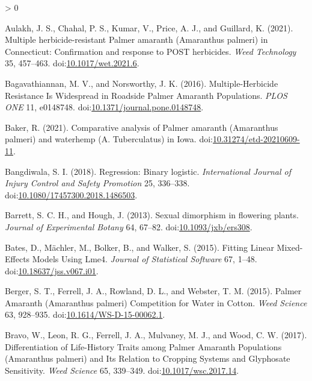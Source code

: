 \documentclass[utf8]{frontiersSCNS}
\newlength{\cslhangindent}
\newenvironment{CSLReferences}[2] %
 {%
  \setlength{\parindent}{0pt}
  \ifodd #1 \everypar{\setlength{\hangindent}{\cslhangindent}}\ignorespaces\fi
  \ifnum #2 > 0
  \setlength{\parskip}{#2\baselineskip}
  \fi
 }%
 {}
\begin{document}
\hypertarget{refs}{}
\begin{CSLReferences}{1}{0}
\leavevmode\hypertarget{ref-aulakh2021}{}%
Aulakh, J. S., Chahal, P. S., Kumar, V., Price, A. J., and Guillard, K.
(2021). Multiple herbicide-resistant {Palmer} amaranth ({Amaranthus}
palmeri) in {Connecticut}: Confirmation and response to {POST}
herbicides. \emph{Weed Technology} 35, 457--463.
doi:\href{https://doi.org/10.1017/wet.2021.6}{10.1017/wet.2021.6}.

\leavevmode\hypertarget{ref-bagavathiannan2016}{}%
Bagavathiannan, M. V., and Norsworthy, J. K. (2016). Multiple-{Herbicide
Resistance Is Widespread} in {Roadside Palmer Amaranth Populations}.
\emph{PLOS ONE} 11, e0148748.
doi:\href{https://doi.org/10.1371/journal.pone.0148748}{10.1371/journal.pone.0148748}.

\leavevmode\hypertarget{ref-baker2021}{}%
Baker, R. (2021). Comparative analysis of {Palmer} amaranth
({Amaranthus} palmeri) and waterhemp ({A}. Tuberculatus) in {Iowa}.
doi:\href{https://doi.org/10.31274/etd-20210609-11}{10.31274/etd-20210609-11}.

\leavevmode\hypertarget{ref-bangdiwala2018}{}%
Bangdiwala, S. I. (2018). Regression: Binary logistic.
\emph{International Journal of Injury Control and Safety Promotion} 25,
336--338.
doi:\href{https://doi.org/10.1080/17457300.2018.1486503}{10.1080/17457300.2018.1486503}.

\leavevmode\hypertarget{ref-barrett2013}{}%
Barrett, S. C. H., and Hough, J. (2013). Sexual dimorphism in flowering
plants. \emph{Journal of Experimental Botany} 64, 67--82.
doi:\href{https://doi.org/10.1093/jxb/ers308}{10.1093/jxb/ers308}.

\leavevmode\hypertarget{ref-bates2015}{}%
Bates, D., Mächler, M., Bolker, B., and Walker, S. (2015). Fitting
{Linear Mixed}-{Effects Models Using} Lme4. \emph{Journal of Statistical
Software} 67, 1--48.
doi:\href{https://doi.org/10.18637/jss.v067.i01}{10.18637/jss.v067.i01}.

\leavevmode\hypertarget{ref-berger2015}{}%
Berger, S. T., Ferrell, J. A., Rowland, D. L., and Webster, T. M.
(2015). Palmer {Amaranth} ({Amaranthus} palmeri) {Competition} for
{Water} in {Cotton}. \emph{Weed Science} 63, 928--935.
doi:\href{https://doi.org/10.1614/WS-D-15-00062.1}{10.1614/WS-D-15-00062.1}.

\leavevmode\hypertarget{ref-bravo2017}{}%
Bravo, W., Leon, R. G., Ferrell, J. A., Mulvaney, M. J., and Wood, C. W.
(2017). Differentiation of {Life}-{History Traits} among {Palmer
Amaranth Populations} ({Amaranthus} palmeri) and {Its Relation} to
{Cropping Systems} and {Glyphosate Sensitivity}. \emph{Weed Science} 65,
339--349.
doi:\href{https://doi.org/10.1017/wsc.2017.14}{10.1017/wsc.2017.14}.


\end{CSLReferences}
\end{document}

